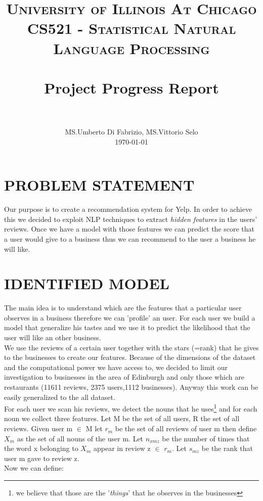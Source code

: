 \documentclass[a4paper, 10pt, conference]{ieeeconf}      %
\title{
		\usefont{OT1}{bch}{b}{n}
		\normalfont \normalsize \textsc{University of Illinois At Chicago\\CS521 - Statistical Natural Language Processing} \\ [25pt]
		\horrule{2pt} \\[0.4cm]
		\huge Project Progress Report \\
		\horrule{2pt} \\[0.3cm]
}
\author{
		\normalfont 								\large
         MS.Umberto Di Fabrizio, MS.Vittorio Selo\\		\normalsize
        \today \\[0.5cm]
}
\date{}
\begin{document}
\maketitle
\thispagestyle{empty}
\pagestyle{empty}

\section{PROBLEM STATEMENT}
Our purpose is to create a recommendation system for Yelp. In order to achieve this we decided to exploit NLP techniques to extract \textit{hidden features} in the users' reviews. Once we have a model with those features we can predict the score that a user would give to a business thus we can recommend to the user a business he will like.
\section{IDENTIFIED MODEL}
The main idea is to understand which are the features that a particular user observes in a business therefore we can 'profile' an user. For each user we build a model that generalize his tastes and we use it to predict the likelihood that the user will like an other business.\\
We use the reviews of a certain user together with the stars (=rank) that he gives to the businesses to create our features. Because of the dimensions of the dataset and the computational power we have access to, we decided to limit our investigation to businesses in the area of Edinburgh and only those which are restaurants (11611 reviews, 2375 users,1112 businesses). Anyway this work can be easily generalized to the all dataset.\\
For each user we scan his reviews, we detect the nouns that he uses\footnote{we believe that those are the '\textit{things}' that he observes in the businesses} and for each noun we collect three features.
Let M be the set of all users, R the set of all reviews.
Given user m $\in$ M let $r_m$ be the set of all reviews of user m then define $X_m$ as the set of all nouns of the user m.
Let $n_{xmz}$ be the number of times that the word x belonging to $X_m$ appear in review z $\in$ $r_m.$
Let $s_{mz}$ be the rank that user m gave to review z.\\
Now we can define:
\end{document}
